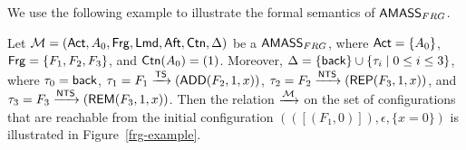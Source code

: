 We use the following example to illustrate the formal semantics of $\textsf{AMASS}_{FRG}$.
\begin{example}\label{exam:frag-amass}
    Let ${\mathcal{M} } = ({\sf Act},A_0,{\sf Frg},{\sf Lmd},{\sf Aft},{\sf Ctn}, \Delta)$ be a {$\textsf{AMASS}_{FRG}$}, where ${\sf Act} = \{A_0\}$, ${\sf Frg} = \{F_1,F_2,F_3\}$, and ${\sf Ctn}(A_0) = (1)$.
    Moreover, $\Delta =\{{\mathsf{back} }\} \cup \{\tau_i \mid 0 \le i \le 3\}$, where
        $\tau_0 = {\mathsf{back} }$,
        $\tau_1 = F_1\xrightarrow{{\sf TS}}(\mathsf{ADD}(F_2,1,x))$,
        $\tau_2 = F_2\xrightarrow{{\sf NTS}}(\mathsf{REP}(F_3,1,x))$, and
        $\tau_3 = F_3\xrightarrow{{\sf NTS}}(\mathsf{REM}(F_3,1,x))$.
Then the relation $\xrightarrow{{\mathcal{M} }}$ on the set of configurations that are reachable from the initial configuration $(([(F_1,0)]),\epsilon,\{x=0\})$ is illustrated in Figure~\ref{frg-example}. 


\end{example}
